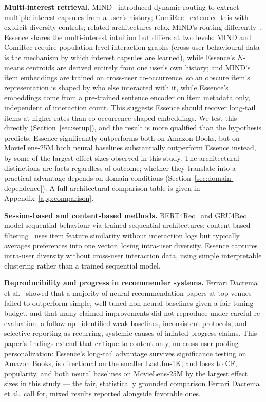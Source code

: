 \documentclass{article}
\begin{document}
\textbf{Multi-interest retrieval.} MIND~\cite{li2019} introduced dynamic routing to extract multiple interest capsules from a user's history; ComiRec~\cite{cen2020} extended this with explicit diversity controls; related architectures relax MIND's routing differently~\cite{tan2021,zhang2022}. Essence shares the multi-interest intuition but differs at two levels: MIND and ComiRec require population-level interaction graphs (cross-user behavioural data is the mechanism by which interest capsules are learned), while Essence's $K$-means centroids are derived entirely from one user's own history; and MIND's item embeddings are trained on cross-user co-occurrence, so an obscure item's representation is shaped by who else interacted with it, while Essence's embeddings come from a pre-trained sentence encoder on item metadata only, independent of interaction count. This suggests Essence should recover long-tail items at higher rates than co-occurrence-shaped embeddings. We test this directly (Section~\ref{sec:setup}), and the result is more qualified than the hypothesis predicts: Essence significantly outperforms both on Amazon Books, but on MovieLens-25M both neural baselines substantially outperform Essence instead, by some of the largest effect sizes observed in this study. The architectural distinctions are facts regardless of outcome; whether they translate into a practical advantage depends on domain conditions (Section~\ref{sec:domain-dependence}). A full architectural comparison table is given in Appendix~\ref{app:comparison}.

\textbf{Session-based and content-based methods.} BERT4Rec~\cite{sun2019} and GRU4Rec~\cite{hidasi2016} model sequential behaviour via trained sequential architectures; content-based filtering~\cite{pazzani2007} uses item feature similarity without interaction logs but typically averages preferences into one vector, losing intra-user diversity. Essence captures intra-user diversity without cross-user interaction data, using simple interpretable clustering rather than a trained sequential model.

\textbf{Reproducibility and progress in recommender systems.} Ferrari Dacrema et al.~\cite{dacrema2019} showed that a majority of neural recommendation papers at top venues failed to outperform simple, well-tuned non-neural baselines given a fair tuning budget, and that many claimed improvements did not reproduce under careful re-evaluation; a follow-up~\cite{dacrema2021} identified weak baselines, inconsistent protocols, and selective reporting as recurring, systemic causes of inflated progress claims. This paper's findings extend that critique to content-only, no-cross-user-pooling personalization: Essence's long-tail advantage survives significance testing on Amazon Books, is directional on the smaller Last.fm-1K, and loses to CF, popularity, and both neural baselines on MovieLens-25M by the largest effect sizes in this study --- the fair, statistically grounded comparison Ferrari Dacrema et al.\ call for, mixed results reported alongside favorable ones.
\end{document}
